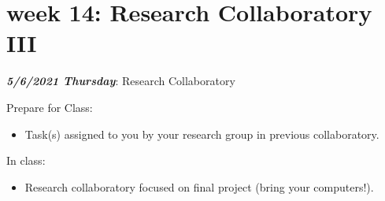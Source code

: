 \documentclass[
]{book}
\providecommand{\tightlist}{%
  \setlength{\itemsep}{0pt}\setlength{\parskip}{0pt}}
\begin{document}
\hypertarget{week-14-research-collaboratory-iii-1}{%
\chapter{week 14: Research Collaboratory III}\label{week-14-research-collaboratory-iii-1}}

\textbf{\emph{5/6/2021 Thursday}}: Research Collaboratory

Prepare for Class:

\begin{itemize}
\tightlist
\item
  Task(s) assigned to you by your research group in previous collaboratory.
\end{itemize}

In class:

\begin{itemize}
\tightlist
\item
  Research collaboratory focused on final project (bring your computers!).
\end{itemize}

  
\end{document}
